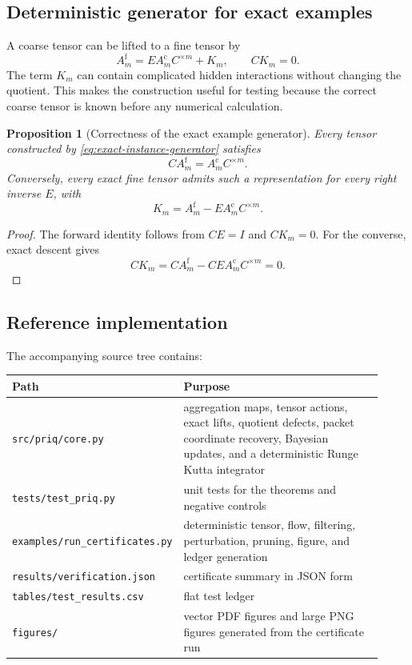 \documentclass[11pt]{article}
\newtheorem{proposition}[theorem]{Proposition}
\theoremstyle{definition}
\theoremstyle{remark}
\newcommand{\fine}{\mathrm f}
\newcommand{\coarse}{\mathrm c}
\begin{document}
\subsection{Deterministic generator for exact examples}
A coarse tensor can be lifted to a fine tensor by
\begin{equation}\label{eq:exact-instance-generator}
  A_m^{\fine}
  =
  EA_m^{\coarse}C^{\times m}+K_m,
  \qquad
  CK_m=0.
\end{equation}
The term $K_m$ can contain complicated hidden interactions without changing the quotient.  This makes the construction useful for testing because the correct coarse tensor is known before any numerical calculation.

\begin{proposition}[Correctness of the exact example generator]\label{prop:exact-instance-generator}
Every tensor constructed by \eqref{eq:exact-instance-generator} satisfies
\[
  CA_m^{\fine}=A_m^{\coarse}C^{\times m}.
\]
Conversely, every exact fine tensor admits such a representation for every right inverse $E$, with
\[
  K_m=A_m^{\fine}-EA_m^{\coarse}C^{\times m}.
\]
\end{proposition}

\begin{proof}
The forward identity follows from $CE=I$ and $CK_m=0$.  For the converse, exact descent gives
\[
  CK_m
  =CA_m^{\fine}-CEA_m^{\coarse}C^{\times m}=0.
\]
\end{proof}

\subsection{Reference implementation}
The accompanying source tree contains:
\begin{center}
\small
\begin{tabular}{@{}p{0.31\linewidth}p{0.61\linewidth}@{}}
\toprule
Path & Purpose\\
\midrule
\texttt{src/priq/core.py} & aggregation maps, tensor actions, exact lifts, quotient defects, packet coordinate recovery, Bayesian updates, and a deterministic Runge Kutta integrator\\
\texttt{tests/test\_priq.py} & unit tests for the theorems and negative controls\\
\texttt{examples/}\allowbreak\texttt{run\_certificates.py} & deterministic tensor, flow, filtering, perturbation, pruning, figure, and ledger generation\\
\texttt{results/verification.json} & certificate summary in JSON form\\
\texttt{tables/test\_results.csv} & flat test ledger\\
\texttt{figures/} & vector PDF figures and large PNG figures generated from the certificate run\\
\bottomrule
\end{tabular}
\end{center}
\end{document}

